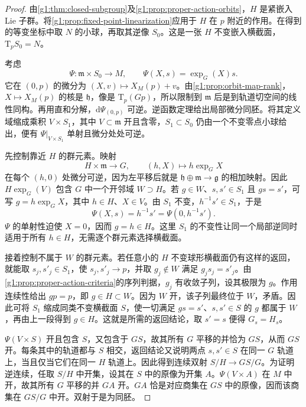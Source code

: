\begin{proof}
	由\cref{g1:thm:closed-subgroup}及\cref{g1:prop:proper-action-orbits}，\(H\) 是紧嵌入 Lie 子群。将\cref{g1:prop:fixed-point-linearization}应用于 \(H\) 在 \(p\) 附近的作用。在得到的等变坐标中取 \(N\) 的小球，再取其逆像 \(S_0\)。这是一张 \(H\) 不变嵌入横截面，\(\mathrm{T}_pS_0=N\)。

	考虑
	\[
		\Psi:\mathfrak m\times S_0\longrightarrow M,\qquad
		\Psi(X,s)=\exp_G(X)s.
	\]
	它在 \((0,p)\) 的微分为 \((X,v)\mapsto X_M(p)+v\)。由\cref{g1:prop:orbit-map-rank}，\(X\mapsto X_M(p)\) 的核是 \(\mathfrak h\)，像是 \(\mathrm{T}_p(Gp)\)，所以限制到 \(\mathfrak m\) 后是到轨道切空间的线性同构。再用直和分解，\(\mathrm{d}\Psi_{(0,p)}\) 可逆。逆函数定理给出局部微分同胚。将其定义域缩成乘积 \(V\times S_1\)，其中 \(V\subset\mathfrak m\) 开且含零，\(S_1\subset S_0\) 仍由一个不变零点小球给出，便有 \(\Psi|_{V\times S_1}\) 单射且微分处处可逆。

	先控制靠近 \(H\) 的群元素。映射
	\[
		H\times\mathfrak m\longrightarrow G,\qquad (h,X)\longmapsto h\exp_G X
	\]
	在每个 \((h,0)\) 处微分可逆，因为左平移后就是 \(\mathfrak h\oplus\mathfrak m\to\mathfrak g\) 的相加映射。因此 \(H\exp_G(V)\) 包含 \(G\) 中一个开邻域 \(W\supset H\)。若 \(g\in W\)、\(s,s'\in S_1\) 且 \(gs=s'\)，可写 \(g=h\exp_G X\)，其中 \(h\in H\)、\(X\in V\)。由 \(S_1\) 不变，\(h^{-1}s'\in S_1\)，于是
	\[
		\Psi(X,s)=h^{-1}s'=\Psi(0,h^{-1}s').
	\]
	\(\Psi\) 的单射性迫使 \(X=0\)，因而 \(g=h\in H\)。这里 \(S_1\) 的不变性让同一个局部逆同时适用于所有 \(h\in H\)，无需逐个群元素选择横截面。

	接着控制不属于 \(W\) 的群元素。若任意小的 \(H\) 不变球形横截面仍有这样的返回，就能取 \(s_j,s'_j\in S_1\)，使 \(s_j,s'_j\to p\)，并取 \(g_j\notin W\) 满足 \(g_js_j=s'_j\)。由\cref{g1:prop:proper-action-criteria}的序列判据，\(g_j\) 有收敛子列，设其极限为 \(g\)。作用连续性给出 \(gp=p\)，即 \(g\in H\subset W\)。因为 \(W\) 开，该子列最终位于 \(W\)，矛盾。因此可将 \(S_1\) 缩成同类不变横截面 \(S\)，使一切满足 \(gs=s'\)、\(s,s'\in S\) 的 \(g\) 都属于 \(W\)，再由上一段得到 \(g\in H\)。这就是所需的返回结论，取 \(s'=s\) 便得 \(G_s=H_s\)。

	\(\Psi(V\times S)\) 开且包含 \(S\)，又包含于 \(GS\)，故其所有 \(G\) 平移的并恰为 \(GS\)，从而 \(GS\) 开。每条其中的轨道都与 \(S\) 相交，返回结论又说明两点 \(s,s'\in S\) 在同一 \(G\) 轨道上，当且仅当它们在同一 \(H\) 轨道上。因此得到连续双射 \(S/H\to GS/G\)。为证明逆连续，任取 \(S/H\) 中开集，设其在 \(S\) 中的原像为开集 \(A\)。\(\Psi(V\times A)\) 在 \(M\) 中开，故其所有 \(G\) 平移的并 \(GA\) 开。\(GA\) 恰是对应商集在 \(GS\) 中的原像，因而该商集在 \(GS/G\) 中开。双射于是为同胚。
\end{proof}


